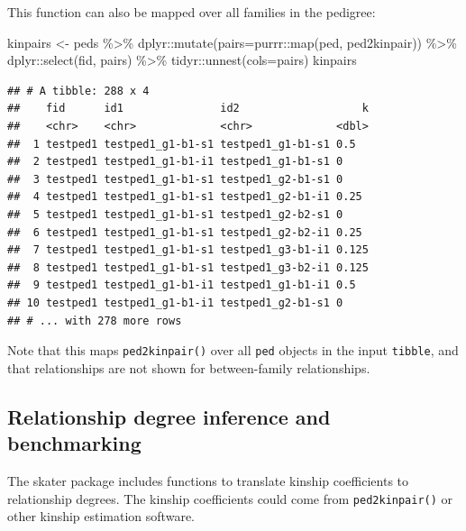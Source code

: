 \documentclass[9pt,a4paper,]{extarticle}
\newenvironment{Shaded}{\begin{snugshade}}{\end{snugshade}}
\newcommand{\AttributeTok}[1]{\textcolor[rgb]{0.77,0.63,0.00}{#1}}
\newcommand{\FunctionTok}[1]{\textcolor[rgb]{0.00,0.00,0.00}{#1}}
\newcommand{\NormalTok}[1]{#1}
\newcommand{\OtherTok}[1]{\textcolor[rgb]{0.56,0.35,0.01}{#1}}
\newcommand{\SpecialCharTok}[1]{\textcolor[rgb]{0.00,0.00,0.00}{#1}}
\begin{document}
This function can also be mapped over all families in the pedigree:

\begin{Shaded}
\begin{Highlighting}[]
\NormalTok{kinpairs }\OtherTok{\textless{}{-}} 
\NormalTok{  peds }\SpecialCharTok{\%\textgreater{}\%} 
\NormalTok{  dplyr}\SpecialCharTok{::}\FunctionTok{mutate}\NormalTok{(}\AttributeTok{pairs=}\NormalTok{purrr}\SpecialCharTok{::}\FunctionTok{map}\NormalTok{(ped, ped2kinpair)) }\SpecialCharTok{\%\textgreater{}\%} 
\NormalTok{  dplyr}\SpecialCharTok{::}\FunctionTok{select}\NormalTok{(fid, pairs) }\SpecialCharTok{\%\textgreater{}\%} 
\NormalTok{  tidyr}\SpecialCharTok{::}\FunctionTok{unnest}\NormalTok{(}\AttributeTok{cols=}\NormalTok{pairs)}
\NormalTok{kinpairs}
\end{Highlighting}
\end{Shaded}

\begin{verbatim}
## # A tibble: 288 x 4
##    fid      id1               id2                   k
##    <chr>    <chr>             <chr>             <dbl>
##  1 testped1 testped1_g1-b1-s1 testped1_g1-b1-s1 0.5  
##  2 testped1 testped1_g1-b1-i1 testped1_g1-b1-s1 0    
##  3 testped1 testped1_g1-b1-s1 testped1_g2-b1-s1 0    
##  4 testped1 testped1_g1-b1-s1 testped1_g2-b1-i1 0.25 
##  5 testped1 testped1_g1-b1-s1 testped1_g2-b2-s1 0    
##  6 testped1 testped1_g1-b1-s1 testped1_g2-b2-i1 0.25 
##  7 testped1 testped1_g1-b1-s1 testped1_g3-b1-i1 0.125
##  8 testped1 testped1_g1-b1-s1 testped1_g3-b2-i1 0.125
##  9 testped1 testped1_g1-b1-i1 testped1_g1-b1-i1 0.5  
## 10 testped1 testped1_g1-b1-i1 testped1_g2-b1-s1 0    
## # ... with 278 more rows
\end{verbatim}

Note that this maps \texttt{ped2kinpair()} over all \texttt{ped} objects in the input \texttt{tibble}, and that relationships are not shown for between-family relationships.

\hypertarget{relationship-degree-inference-and-benchmarking}{%
\subsection{Relationship degree inference and benchmarking}\label{relationship-degree-inference-and-benchmarking}}

The skater package includes functions to translate kinship coefficients to relationship degrees. The kinship coefficients could come from \texttt{ped2kinpair()} or other kinship estimation software.
\end{document}
